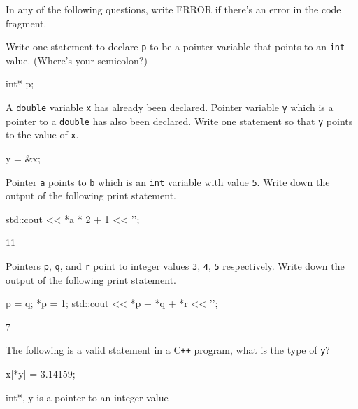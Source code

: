 

In any of the following questions, write ERROR if there's
an error in the code fragment.

\nextq
Write one statement to declare \verb!p! to be a pointer
variable that points to an \verb!int! value.
(Where's your semicolon?)
\\
\ANSWER
\begin{answercode}
int* p;
\end{answercode}
\vspace{-6pt}

\nextq
A \verb!double! variable \verb$x$ has already been declared.
Pointer variable \verb!y! which is a pointer to a \verb!double!
has also been declared.
Write one statement so that \verb!y! points to the value of
\verb!x!.
\\
\ANSWER
\begin{answercode}
y = &x;
\end{answercode}

\nextq
Pointer \verb!a! points to \verb!b! which is an \verb!int!
variable with value \verb!5!.
Write down the output of the following print statement.
\begin{console}
std::cout << *a * 2 + 1 << '\n';
\end{console}
\ANSWER
\begin{answercode}
11
\end{answercode}

\nextq
Pointers \verb!p!, \verb!q!, and \verb!r! point
to integer values \verb!3!, \verb!4!, \verb!5!
respectively.
Write down the output of the following print statement.
\begin{console}
p = q;
*p = 1;
std::cout << *p + *q + *r << '\n';
\end{console}
\ANSWER
\begin{answercode}
7
\end{answercode}

\nextq
The following is a valid statement in a C\texttt{++} program,
what is the type of \verb!y!?
\begin{console}
x[*y] = 3.14159;
\end{console}
\ANSWER
\begin{answercode}
int*, y is a pointer to an integer value
\end{answercode}


